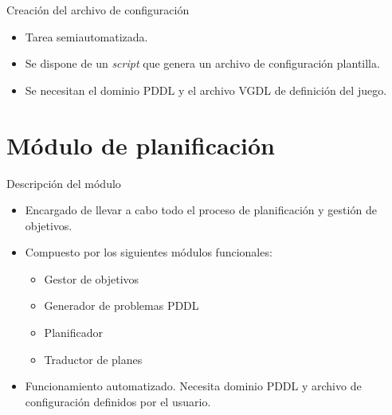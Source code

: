 \documentclass[11pt]{beamer}    %
\begin{document}
    \begin{frame}{Creación del archivo de configuración}
        \begin{itemize}
            \item Tarea semiautomatizada.
            \item Se dispone de un \textit{script} que genera un archivo de configuración
            plantilla.
            \item Se necesitan el dominio PDDL y el archivo VGDL de definición del juego. 
        \end{itemize}

    \end{frame}
    \section{Módulo de planificación}

    \begin{frame}{Descripción del módulo}
        \begin{itemize}
            \item Encargado de llevar a cabo todo el proceso de \alert{planificación} y
            \alert{gestión de objetivos}.
            \item Compuesto por los siguientes módulos funcionales:
            \begin{itemize}
                \item Gestor de objetivos
                \item Generador de problemas PDDL
                \item Planificador
                \item Traductor de planes
            \end{itemize}
            \item Funcionamiento automatizado. Necesita dominio PDDL y archivo de configuración
            definidos por el usuario.
        \end{itemize}

    \end{frame}
\end{document}
